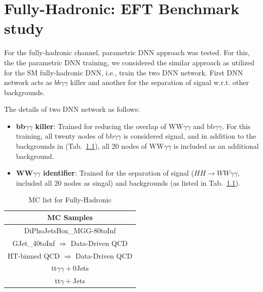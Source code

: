 \chapter{Fully-Hadronic: EFT Benchmark study}
\label{sec:FHEFTBenchmarkDNN}

For the fully-hadronic channel, parametric DNN approach was tested. For this, the the parametric DNN training,
we considered the similar approach as utilized for the SM fully-hadronic DNN, i.e., train the two DNN network.
First DNN network acts as $bb\gamma\gamma$ killer and another for the separation of signal w.r.t. other backgrounds.

The details of two DNN network as follows:
\begin{itemize}
  \item \textbf{bb$\gamma\gamma$ killer}: Trained for reducing the overlap of WW$\gamma\gamma$ and bb$\gamma\gamma$. For this training, all twenty nodes of bb$\gamma\gamma$ is considered signal,
  and in addition to the backgrounds in (Tab.~\ref{tab:fullyHadronicMCBkg_Appendix}), all 20 nodes of WW$\gamma\gamma$ is included as an additional background.
  \item \textbf{WW$\gamma\gamma$ identifier}: Trained for the separation of signal ($HH \rightarrow WW\gamma\gamma$, included all 20 nodes as singal) and backgrounds (as listed in Tab.~\ref{tab:fullyHadronicMCBkg_Appendix}).
\end{itemize}

\begin{table}[!htbp]
  \begin{center}
          \begin{tabular}{|c|}
                \hline
                \textbf{MC Samples}  \\ \hline
                DiPhoJetsBox\_MGG-80toInf  \\ \hline
                GJet\_40toInf $\Rightarrow$ Data-Driven QCD \\ \hline
                HT-binned QCD  $\Rightarrow$ Data-Driven QCD\\ \hline
                tt$\gamma\gamma+$0Jets  \\ \hline
                tt$\gamma+$Jets  \\ \hline
          \end{tabular}
  \caption{MC list for Fully-Hadronic}
  \label{tab:fullyHadronicMCBkg_Appendix}
  \end{center}
\end{table}

